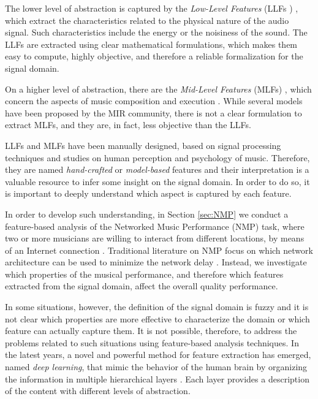 The lower level of abstraction is captured by the \textit{Low-Level Features} (LLFs ) \cite{Kim2004}, which extract the characteristics related to the physical nature of the audio signal. Such characteristics include the energy or the noisiness of the sound. The LLFs are extracted using clear mathematical formulations, which makes them easy to compute, highly objective, and therefore a reliable formalization for the signal domain. 

On a higher level of abstraction, there are the \textit{Mid-Level Features} (MLFs) \cite{Fu2011}, which concern the aspects of music composition and execution \cite{Muller2011}. While several models have been proposed by the MIR community, there is not a clear formulation to extract MLFs, and they are, in fact, less objective than the LLFs. 

LLFs and MLFs have been manually designed, based on signal processing techniques and studies on human perception and psychology of music. Therefore, they are named \textit{hand-crafted} or \textit{model-based} features and their interpretation is a valuable resource to infer some insight on the signal domain. In order to do so, it is important to deeply understand which aspect is captured by each feature. 

In order to develop such understanding, in Section \ref{sec:NMP} we conduct a feature-based analysis of the Networked Music Performance (NMP) task, where two or more musicians are willing to interact from different locations, by means of an Internet connection \cite{barbosa2003displaced}. Traditional literature on NMP focus on which network architecture can be used to minimize the network delay \cite{saputra2012design,gu2005network,renwick2012sourcenode}. Instead, we investigate which properties of the musical performance, and therefore which features extracted from the signal domain, affect the overall quality performance.  

In some situations, however, the definition of the signal domain is fuzzy and it is not clear which properties are more effective to characterize the domain or which feature can actually capture them. It is not possible, therefore, to address the problems related to such situations using feature-based analysis techniques. In the latest years, a novel and powerful method for feature extraction has emerged, named \textit{deep learning}, that mimic the behavior of the human brain by organizing the information in multiple hierarchical layers \cite{Haykin1998,Goodfellow2016}. Each layer provides a description of the content with different levels of abstraction.%

